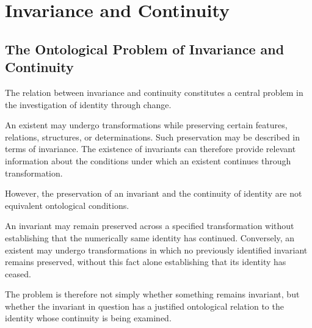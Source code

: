 %
%

\section{Invariance and Continuity}
\label{sec:ch05-invariance-and-continuity}

\subsection{The Ontological Problem of Invariance and Continuity}

The relation between invariance and continuity constitutes
a central problem in the investigation of identity
through change.

An existent may undergo transformations while preserving
certain features, relations, structures, or determinations.
Such preservation may be described in terms of invariance.
The existence of invariants can therefore provide relevant
information about the conditions under which an existent
continues through transformation.

However, the preservation of an invariant and the
continuity of identity are not equivalent ontological
conditions.

An invariant may remain preserved across a specified
transformation without establishing that the numerically
same identity has continued. Conversely, an existent
may undergo transformations in which no previously
identified invariant remains preserved, without this
fact alone establishing that its identity has ceased.

The problem is therefore not simply whether something
remains invariant, but whether the invariant in question
has a justified ontological relation to the identity
whose continuity is being examined.

